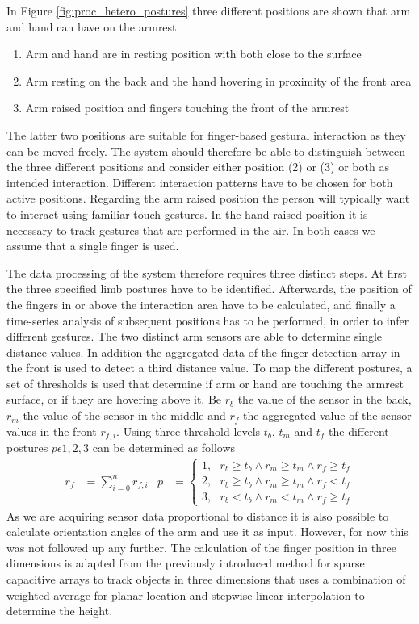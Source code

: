In Figure \ref{fig:proc_hetero_postures} three different positions are shown that arm and hand can have on the armrest. 
\begin{enumerate}
\item Arm and hand are in resting position with both close to the surface
\item Arm resting on the back and the hand hovering in proximity of the front area
\item Arm raised position and fingers touching the front of the armrest
\end{enumerate}
The latter two positions are suitable for finger-based gestural interaction as they can be moved freely. The system should therefore be able to distinguish between the three different positions and consider either position (2) or (3) or both as intended interaction. Different interaction patterns have to be chosen for both active positions. Regarding the arm raised position the person will typically want to interact using familiar touch gestures. In the hand raised position it is necessary to track gestures that are performed in the air. In both cases we assume that a single finger is used.  
 
The data processing of the system therefore requires three distinct steps. At first the three specified limb postures have to be identified. Afterwards, the position of the fingers in or above the interaction area have to be calculated, and finally a time-series analysis of subsequent positions has to be performed, in order to infer different gestures. The two distinct arm sensors are able to determine single distance values. In addition the aggregated data of the finger detection array in the front is used to detect a third distance value. To map the different postures, a set of thresholds is used that determine if arm or hand are touching the armrest surface, or if they are hovering above it. Be $r_b$ the value of the sensor in the back, $r_m$ the value of the sensor in the middle and $r_f$ the aggregated value of the sensor values in the front $r_{f,i}$. Using three threshold levels $t_b$, $t_m$ and $t_f$ the different postures $p\epsilon{1,2,3}$ can be determined as follows
\begin{align}
r_f&=\sum^n_{i=0}{r_{f,i}} & p&=\left\{ \begin{array}{c}
1,\ \ \ r_b\ge t_b \wedge r_m\ge t_m \wedge r_f\ge t_f\\ 
2,\ \ \ r_b\ge t_b \wedge r_m\ge t_m \wedge r_f< t_f \\ 
3,\ \ \ r_b< t_b \wedge r_m< t_m \wedge r_f\ge t_f \end{array}
\right.
\end{align}
As we are acquiring sensor data proportional to distance it is also possible to calculate orientation angles of the arm and use it as input. However, for now this was not followed up any further.
The calculation of the finger position in three dimensions is adapted from the previously introduced method for sparse capacitive arrays to track objects in three dimensions that uses a combination of weighted average for planar location and stepwise linear interpolation to determine the height. 

